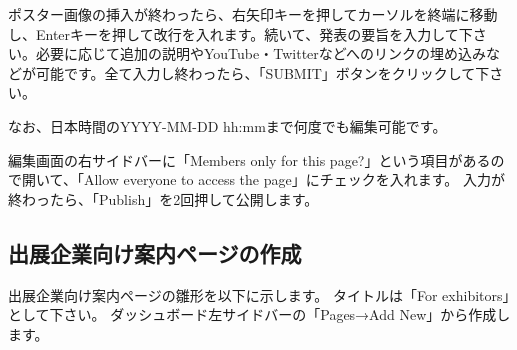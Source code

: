 \documentclass[titlepage,10pt,a4paper,uplatex]{jsbook}
\newenvironment{content}{\begin{shaded}\vspace{-1em}\raggedright\ttfamily\footnotesize\setlength{\baselineskip}{1.4em}}{\end{shaded}\vspace{-1em}}
\begin{document}
\begin{content}
ポスター画像の挿入が終わったら、右矢印キーを押してカーソルを終端に移動し、Enterキーを押して改行を入れます。続いて、発表の要旨を入力して下さい。必要に応じて追加の説明やYouTube・Twitterなどへのリンクの埋め込みなどが可能です。全て入力し終わったら、「SUBMIT」ボタンをクリックして下さい。

なお、日本時間のYYYY-MM-DD hh:mmまで何度でも編集可能です。
\end{content}

編集画面の右サイドバーに「Members only for this page?」という項目があるので開いて、「Allow everyone to access the page」にチェックを入れます。
入力が終わったら、「Publish」を2回押して公開します。

\subsection{出展企業向け案内ページの作成}

出展企業向け案内ページの雛形を以下に示します。
タイトルは「For exhibitors」として下さい。
ダッシュボード左サイドバーの「Pages→Add New」から作成します。
\end{document}
